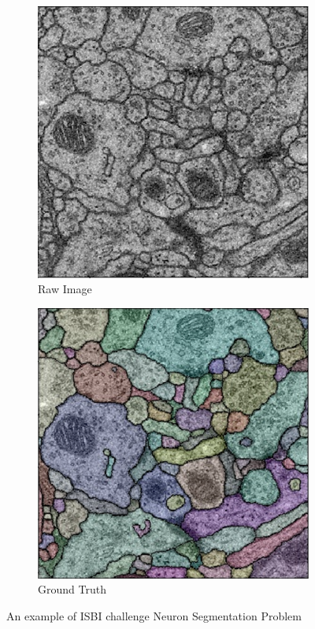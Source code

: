 \documentclass[12pt, a4paper]{scrartcl}
\begin{document}
\begin{figure}[h]
\centering
\begin{subfigure}{.4\textwidth}
  \centering
  \includegraphics[width=.8\linewidth]{ISBIexampleRaw}
  \caption{Raw Image}
  \label{fig:ISBIexampleRaw}
\end{subfigure}%
\begin{subfigure}{.4\textwidth}
  \centering
  \includegraphics[width=.8\linewidth]{ISBIexampleGT}
  \caption{Ground Truth}
  \label{fig:ISBIexampleGT}
\end{subfigure}
\caption{An example of ISBI challenge Neuron Segmentation Problem}
\label{fig:ISBIexample}
\end{figure}
\end{document}
